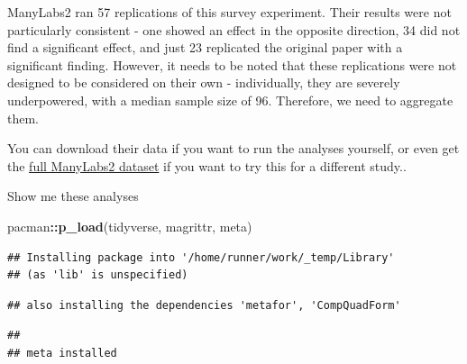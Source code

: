 \documentclass[
]{book}
\newenvironment{Shaded}{\begin{snugshade}}{\end{snugshade}}
\newcommand{\KeywordTok}[1]{\textcolor[rgb]{0.13,0.29,0.53}{\textbf{#1}}}
\newcommand{\NormalTok}[1]{#1}
\newcommand{\OperatorTok}[1]{\textcolor[rgb]{0.81,0.36,0.00}{\textbf{#1}}}
\begin{document}
ManyLabs2 ran 57 replications of this survey experiment. Their results were not particularly consistent - one showed an effect in the opposite direction, 34 did not find a significant effect, and just 23 replicated the original paper with a significant finding. However, it needs to be noted that these replications were not designed to be considered on their own - individually, they are severely underpowered, with a median sample size of 96. Therefore, we need to aggregate them.

You can download their data if you want to run the analyses yourself, or even get the \href{https://osf.io/fanre/}{full ManyLabs2 dataset} if you want to try this for a different study..

Show me these analyses

\begin{Shaded}
\begin{Highlighting}[]
\NormalTok{pacman}\OperatorTok{::}\KeywordTok{p_load}\NormalTok{(tidyverse, magrittr, meta)}
\end{Highlighting}
\end{Shaded}

\begin{verbatim}
## Installing package into '/home/runner/work/_temp/Library'
## (as 'lib' is unspecified)
\end{verbatim}

\begin{verbatim}
## also installing the dependencies 'metafor', 'CompQuadForm'
\end{verbatim}

\begin{verbatim}
## 
## meta installed
\end{verbatim}
\end{document}
